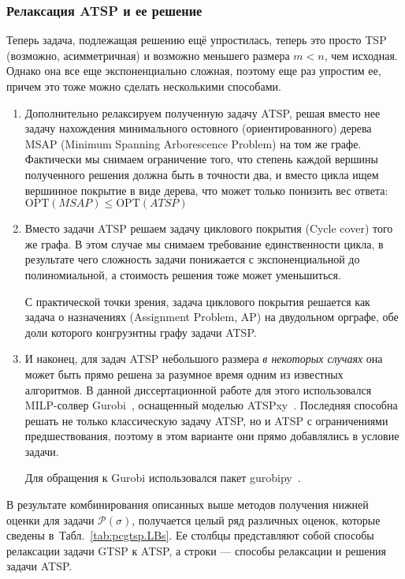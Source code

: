 \subsubsection{Релаксация ATSP и ее решение}
Теперь задача,
подлежащая решению ещё упростилась,
теперь это просто TSP
(возможно, асимметричная)
и возможно меньшего размера $m<n$,
чем исходная.
Однако она все еще экспоненциально сложная,
поэтому еще раз упростим ее,
причем это тоже можно сделать несколькими способами.

\begin{enumerate}
  \item
  Дополнительно релаксируем полученную задачу ATSP,
  решая вместо нее задачу нахождения
  минимального остовного (ориентированного) дерева
  MSAP
  (Minimum Spanning Arborescence Problem)
  на том же графе.
  Фактически мы снимаем ограничение того,
  что степень каждой вершины полученного решения должна
  быть в точности два,
  и вместо цикла ищем вершинное покрытие
  в виде дерева,
  что может только понизить вес ответа:
  $\mathrm{OPT}(MSAP) \leqslant \mathrm{OPT}(ATSP)$
  \item
  Вместо задачи ATSP решаем задачу циклового покрытия
  (Cycle cover) того же графа.
  В этом случае мы снимаем требование единственности цикла,
  в результате чего сложность задачи понижается с экспоненциальной
  до полиномиальной,
  а стоимость решения тоже может уменьшиться.

  С практической точки зрения,
  задача циклового покрытия решается как
  задача о назначениях
  (Assignment Problem, AP)
  на двудольном орграфе,
  обе доли которого конгруэнтны
  графу задачи ATSP.
  \item
  И наконец,
  для задач ATSP
  небольшого размера
  \textit{в некоторых случаях}
  она может быть прямо решена
  за разумное время одним
  из известных алгоритмов.
  В данной диссертационной работе
  для этого использовался MILP-солвер
  Gurobi~\cite{bi:Gurobi},
  оснащенный моделью
  ATSPxy~\autocite{SARIN2005}.
  Последняя способна решать не только
  классическую задачу ATSP,
  но и ATSP с ограничениями предшествования,
  поэтому в этом варианте они прямо
  добавлялись в условие задачи.

  Для обращения к Gurobi
  использовался пакет gurobipy~\cite{bi:GurobiPy}.
\end{enumerate}

В результате комбинирования описанных выше методов
получения нижней оценки для задачи
$\mathcal P(\sigma)$,
получается целый ряд различных оценок,
которые сведены в~Табл.~\ref{tab:pcgtsp.LBs}.
Ее столбцы представляют собой способы релаксации
задачи GTSP к ATSP,
а строки --- способы релаксации и решения
задачи ATSP.

